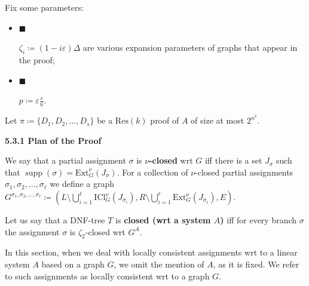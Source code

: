 \documentclass[10pt,a4paper]{article}
\begin{document}
Fix some parameters:\par


\begin{itemize}


\item[] 
$\blacksquare$ 


$\zeta_{i}\coloneqq(1-i\varepsilon)\Delta$ are various expansion parameters of graphs that
appear in the proof;\par





\item[] 
$\blacksquare$ 


$p\coloneqq\varepsilon\frac{r}{n}$.\par





\end{itemize}




Let $\pi\coloneqq\{D_{1},D_{2},\dots,D_{s}\}$ be a $\mathrm{Res}(k)$ proof of $A$ of size at most $2^{n^{\delta}}$.\par




\par\medskip\noindent\textbf{
5.3.1 Plan of the Proof}\par




We say that a partial assignment $\sigma$ is $\nu$\textbf{-closed} wrt $G$ iff there is a set
$J_{\sigma}$ such that $\operatorname*{supp}(\sigma)=\mathrm{Ext}_{G}^{\nu}\left(J_{\sigma}\right)$. For a collection of $\nu$-closed
partial assignments $\sigma_{1},\sigma_{2},\dots,\sigma_{\ell}$ we define a graph
$G^{\sigma_{1},\sigma_{2},\dots,\sigma_{\ell}}\coloneqq(L\setminus\bigcup%
\limits_{i=1}^{\ell}\mathrm{ICl}_{G}^{\nu}\left(J_{\sigma_{i}}\right),R%
\setminus\bigcup\limits_{i=1}^{\ell}\mathrm{Ext}_{G}^{\nu}\left(J_{\sigma_{i}}%
\right),E)$.\par




Let us say that a DNF-tree $T$ is \textbf{closed (wrt a system $A$)} iff for every branch $\sigma$ the
assignment $\sigma$ is $\zeta_{2}$-closed wrt $G^{A}$.\par




In this section, when we deal with locally consistent assignments wrt to a linear system $A$ based on
a graph $G$, we omit the mention of $A$, as it is fixed. We refer to such assignments as
locally consistent wrt to a graph $G$.\par
\end{document}
